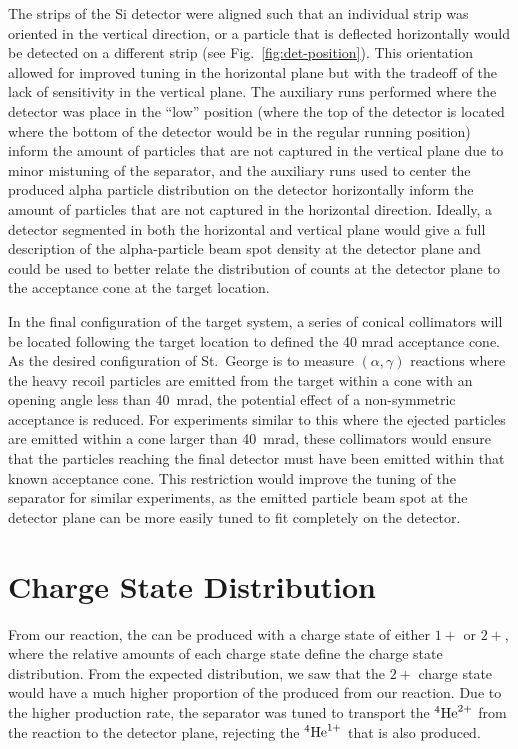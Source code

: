 The strips of the Si detector were aligned such that an individual strip
was oriented in the vertical direction, or a particle that is deflected
horizontally would be detected on a different strip (see
Fig.~\ref{fig:det-position}). This orientation allowed for
improved tuning in the horizontal plane but with the tradeoff of the
lack of sensitivity in the vertical plane. The auxiliary runs performed
where the detector was place in the ``low'' position (where the top of
the detector is located where the bottom of the detector would be in the
regular running position) inform the amount of particles that are not
captured in the vertical plane due to minor mistuning of the separator,
and the auxiliary runs used to center the produced alpha particle
distribution on the detector horizontally inform the amount of particles
that are not captured in the horizontal direction. Ideally, a detector
segmented in both the horizontal and vertical plane would give a full
description of the alpha-particle beam spot density at the detector
plane and could be used to better relate the distribution of counts at
the detector plane to the acceptance cone at the target location.

In the final configuration of the target system, a series of conical
collimators will be located following the target location to defined the
40 mrad acceptance cone. As the desired configuration of St.\ George is
to measure $(\alpha,\gamma)$ reactions where the heavy recoil particles
are emitted from the target within a cone with an opening angle less
than 40~mrad, the potential effect of a non-symmetric acceptance is
reduced. For experiments similar to this where the ejected particles are
emitted within a cone larger than 40~mrad, these collimators would
ensure that the particles reaching the final detector must have been
emitted within that known acceptance cone. This restriction would
improve the tuning of the separator for similar experiments, as the
emitted particle beam spot at the detector plane can be more easily
tuned to fit completely on the detector.


\section{Charge State Distribution}

From our reaction, the  can be produced with a charge state
of either $1+$ or $2+$, where the relative amounts of each charge state
define the charge state distribution. From the expected distribution, we
saw that the $2+$ charge state would have a much higher proportion of
the produced  from our reaction. Due to the higher production
rate, the separator was tuned to transport the ${}^{4}\textrm{He}^{2+}$ from
the reaction to the detector plane, rejecting the ${}^{4}\textrm{He}^{1+}$
that is also produced.

